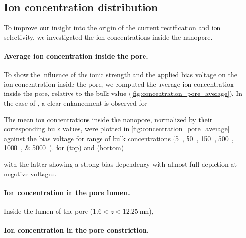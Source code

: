 \documentclass[journal=ancac3, manuscript=article, etalmode=truncate,maxauthors=0]{achemso}
\begin{document}
\subsection{Ion concentration distribution}
To improve our insight into the origin of the current rectification and ion selectivity, we investigated the ion concentrations inside the nanopore.

\paragraph{Average ion concentration inside the pore.}
To show the influence of the ionic strength and the applied bias voltage on the ion concentration inside the pore,
we computed the average ion concentration inside the pore, relative to the bulk value (\cref{fig:concentration_pore_average}).
In the case of , a clear enhancement is observed for 

The mean ion concentrations inside the nanopore, normalized by their corresponding bulk values, were plotted in \cref{fig:concentration_pore_average} against the bias voltage for range of bulk concentrations (\SIlist{5;50;150;500;1000;5000}{\mM}).
for  (top) and  (bottom)





with the latter showing a strong bias dependency 
with almost full depletion at negative voltages.
\paragraph{Ion concentration in the pore lumen.}
Inside the lumen of the pore ($1.6<z<\SI{12.25}{\nm}$), 
\paragraph{Ion concentration in the pore constriction.}




%
\end{document}
